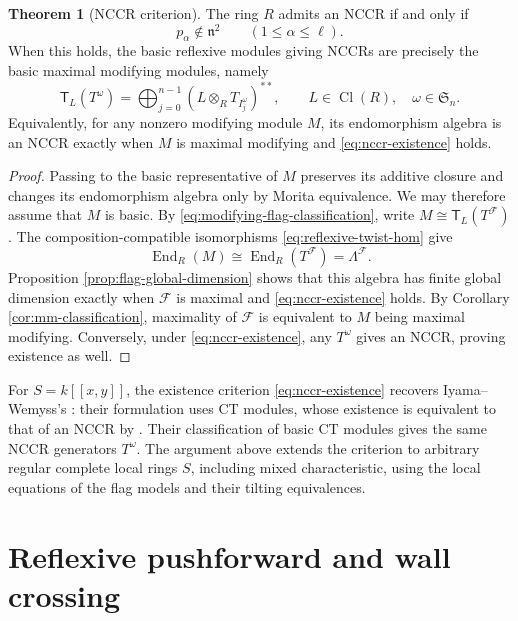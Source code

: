 \documentclass[a4paper,reqno]{amsart}
\def\F{\mathcal{F}}
\def\n{\mathfrak{n}}
\DeclareMathOperator{\End}{End}
\DeclareMathOperator{\Cl}{Cl}
\theoremstyle{definition}
\newtheorem{Thm}{Theorem}[section]
\begin{document}
\begin{Thm}[NCCR criterion]\label{thm:nccr-criterion}
The ring $R$ admits an NCCR if and only if
\begin{equation}\label{eq:nccr-existence}
p_\alpha\notin\n^2\qquad(1\le\alpha\le\ell).
\end{equation}
When this holds, the basic reflexive modules giving NCCRs are precisely the basic maximal modifying modules, namely
\[
\mathsf T_L(T^\omega)
=\bigoplus_{j=0}^{n-1}(L\otimes_RT_{I_j^\omega})^{**},
\qquad L\in\Cl(R),\quad\omega\in\mathfrak S_n.
\]
Equivalently, for any nonzero modifying module $M$, its endomorphism algebra is an NCCR exactly when $M$ is maximal modifying and \eqref{eq:nccr-existence} holds.
\end{Thm}
\begin{proof}
Passing to the basic representative of $M$ preserves its additive closure and changes its endomorphism algebra only by Morita equivalence. We may therefore assume that $M$ is basic. By \eqref{eq:modifying-flag-classification}, write $M\cong\mathsf T_L(T^\F)$. The composition-compatible isomorphisms \eqref{eq:reflexive-twist-hom} give
\[
\End_R(M)\cong\End_R(T^\F)=\Lambda^\F.
\]
Proposition \ref{prop:flag-global-dimension} shows that this algebra has finite global dimension exactly when $\F$ is maximal and \eqref{eq:nccr-existence} holds. By Corollary \ref{cor:mm-classification}, maximality of $\F$ is equivalent to $M$ being maximal modifying. Conversely, under \eqref{eq:nccr-existence}, any $T^\omega$ gives an NCCR, proving existence as well.
\end{proof}

For $S=k[[x,y]]$, the existence criterion \eqref{eq:nccr-existence} recovers Iyama--Wemyss's \cite[Theorem 5.1(3)]{IW18}: their formulation uses CT modules, whose existence is equivalent to that of an NCCR by \cite[Corollary 5.9]{IW}. Their classification of basic CT modules gives the same NCCR generators $T^\omega$. The argument above extends the criterion to arbitrary regular complete local rings $S$, including mixed characteristic, using the local equations of the flag models and their tilting equivalences.

\section{Reflexive pushforward and wall crossing}\label{sec:reconstruction-pushforward}\label{sec:mutation-geometry}
\end{document}
